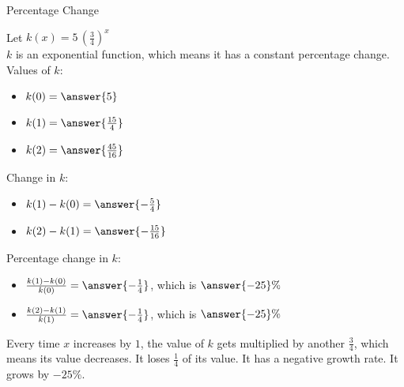 \documentclass{ximera}
\begin{document}
\begin{example} Percentage Change



Let $k(x) = 5 \, \left(\frac{3}{4}\right)^x$ \\

$k$ is an exponential function, which means it has a constant percentage change. \\

Values of $k$:

\begin{itemize}
\item $k(0) = \answer{5}$

\item $k(1) = \answer{\frac{15}{4}}$

\item $k(2) = \answer{\frac{45}{16}}$
\end{itemize}



Change in $k$:

\begin{itemize}
\item $k(1) - k(0) = \answer{-\frac{5}{4}}$

\item $k(2) - k(1) = \answer{-\frac{15}{16}}$

\end{itemize}





Percentage change in $k$:

\begin{itemize}
\item $\frac{k(1) - k(0)}{k(0)} = \answer{-\frac{1}{4}}$, which is $\answer{-25}\%$

\item $\frac{k(2) - k(1)}{k(1)} = \answer{-\frac{1}{4}}$, which is $\answer{-25}\%$

\end{itemize}






\end{example}

Every time $x$ increases by $1$, the value of $k$ gets multiplied by another $\frac{3}{4}$, which means its value decreases. It loses $\frac{1}{4}$ of its value. It has a negative growth rate. It grows by $-25\%$.
\end{document}
